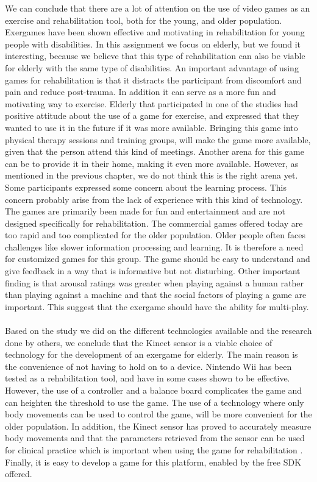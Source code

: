 We can conclude that there are a lot of attention on the use of video games as an exercise and rehabilitation tool, both for the young, and older population. Exergames have been shown effective and motivating in rehabilitation for young people with disabilities. In this assignment we focus on elderly, but we found it interesting, because we believe that  this type of rehabilitation can also be viable for elderly with the same type of disabilities. An important advantage of using games for rehabilitation is that it distracts the participant from discomfort and pain and reduce post-trauma. In addition it can serve as a more fun and motivating way to exercise. Elderly that participated in one of the studies had positive attitude about the use of a game for exercise, and expressed that they wanted to use it in the future if it was more available. Bringing this game into physical therapy sessions and training groups, will make the game more available, given that the  person attend this kind of meetings. Another arena for this game can be to provide it in their home, making it even more available. However, as mentioned in the previous chapter, we do not think this is the right arena yet.  Some participants  expressed some concern about the learning process. This concern probably arise from the lack of experience with this kind of technology.  The games are primarily been made for fun and entertainment and are not designed specifically for rehabilitation.  The commercial games offered today are too rapid and too complicated for the older population. Older people often faces challenges like slower information processing and learning. It is therefore a need for customized games for this group. The game should be easy to understand and give feedback in a way that is informative but not disturbing. Other important finding is that arousal ratings was greater when playing against a human rather than playing against a machine and that the social factors of playing a game are important. This suggest that the exergame should have the ability for multi-play.  \\ \\
Based on the study we did on the different technologies available and the research done by others, we conclude that the Kinect sensor is a viable choice of technology for the development of an exergame for elderly. The main reason is the convenience of not having to hold on to a device. Nintendo Wii has been tested as a rehabilitation tool, and have in some cases shown to be effective. However, the use of a controller and a balance board complicates the game and can heighten the threshold to use the game.  The use  of a technology where only body movements can be used to control the game, will be more convenient for the older population. In addition, the Kinect sensor has proved to accurately measure body movements and that the parameters retrieved from the sensor can be used for clinical practice which is important when using the game for rehabilitation .  Finally,  it is easy to develop a game for this platform, enabled by the free SDK offered.




